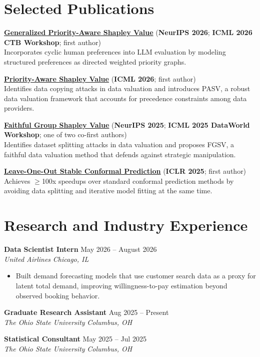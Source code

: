 \documentclass[letterpaper,10pt]{article}
\newcommand{\publication}[4]{%
  \textbf{\href{#1}{#2}} {\small (#3)}\\
  {\small #4}\par\vspace{2.5pt}
}
\newcommand{\roleline}[4]{%
  \textbf{#1} \hfill {\color{muted}#2}\\
  \textit{#3} \hfill \textit{#4}\par\vspace{1pt}
}
\begin{document}
\section{Selected Publications}
\publication
  {https://arxiv.org/abs/2605.15018}
  {Generalized Priority-Aware Shapley Value}
  {\textcolor{venue}{\textbf{NeurIPS 2026}}; \textcolor{venue}{\textbf{ICML 2026 CTB Workshop}}; first author}
  {Incorporates cyclic human preferences into LLM evaluation by modeling structured preferences as directed weighted priority graphs.}
\publication
  {https://arxiv.org/abs/2602.09326}
  {Priority-Aware Shapley Value}
  {\textcolor{venue}{\textbf{ICML 2026}}; first author}
  {Identifies data copying attacks in data valuation and introduces PASV, a robust data valuation framework that accounts for precedence constraints among data providers.}
\publication
  {https://arxiv.org/abs/2505.19013}
  {Faithful Group Shapley Value}
  {\textcolor{venue}{\textbf{NeurIPS 2025}}; \textcolor{venue}{\textbf{ICML 2025 DataWorld Workshop}}; one of two co-first authors}
  {Identifies dataset splitting attacks in data valuation and proposes FGSV, a faithful data valuation method that defends against strategic manipulation.}
\publication
  {https://openreview.net/forum?id=Bt1vnCnAVS}
  {Leave-One-Out Stable Conformal Prediction}
  {\textcolor{venue}{\textbf{ICLR 2025}}; first author}
  {Achieves $\geq$100x speedups over standard conformal prediction methods by avoiding data splitting and iterative model fitting at the same time.}

\section{Research and Industry Experience}
\roleline{Data Scientist Intern}{May 2026 -- August 2026}{United Airlines}{Chicago, IL}
\begin{itemize}
  \item Built demand forecasting models that use customer search data as a proxy for latent total demand, improving willingness-to-pay estimation beyond observed booking behavior.
\end{itemize}
\roleline{Graduate Research Assistant}{Aug 2025 -- Present}{The Ohio State University}{Columbus, OH}
\roleline{Statistical Consultant}{May 2025 -- Jul 2025}{The Ohio State University}{Columbus, OH}
\vspace{1pt}
\end{document}
